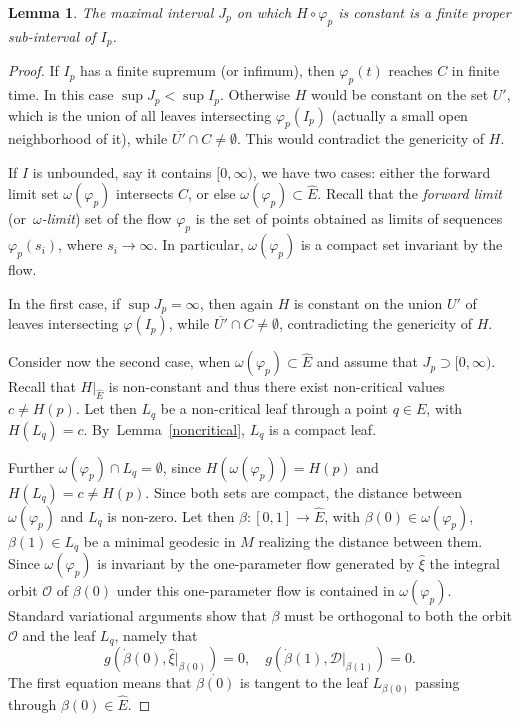 \documentclass[10pt]{amsart}
\let\mathcal\mathscr
\newtheorem{lemma}[theorem]{Lemma}
\theoremstyle{definition}
\theoremstyle{remark}
\numberwithin{equation}{section}
\begin{document}
\begin{lemma}\label{maxinterval}
The maximal interval $J_p$ on which $H\circ \varphi_p$ is constant is a finite proper sub-interval of $I_p$.
\end{lemma}
\begin{proof}
If $I_p$ has a finite supremum (or infimum), then $\varphi_p(t)$
reaches $C$ in finite time. In this case $\sup J_p <\sup I_p$. Otherwise $H$ would be constant on the set
$U'$, which is the union of all leaves intersecting $\varphi_p(I_p)$
(actually a small open neighborhood of it), while $\overline{U'}\cap C\neq \emptyset$.
This would contradict the genericity of $H$.

If $I$ is unbounded, say it contains $[0,\infty)$, we have two cases:
either the forward limit set $\omega(\varphi_p)$ intersects $C$, or else $\omega(\varphi_p)\subset \widehat{E}$.
Recall that the \emph{forward limit} (or~\emph{$\omega$-limit}) set of the flow
$\varphi_p$ is the set of points obtained as limits of sequences
$\varphi_p(s_i)$, where $s_i\to \infty$. In particular, $\omega(\varphi_p)$ is a compact set
invariant by the flow.

In the first case, if $\sup J_p=\infty$, then again
$H$ is constant on the union $U'$ of leaves intersecting $\varphi(I_p)$,
while $\overline{U'}\cap C\neq \emptyset$,
contradicting the genericity of $H$.

Consider now the second case, when $\omega(\varphi_p)\subset \widehat{E}$ and assume that $J_p\supset [0,\infty)$.
Recall that $H|_{\widehat{E}}$ is non-constant and thus there exist non-critical values $c\neq H(p)$.
Let then $L_q$ be a non-critical leaf through a point $q\in E$, with $H(L_q)=c$.
By~Lemma~\ref{noncritical}, $L_q$ is a compact leaf.

Further $\omega(\varphi_p)\cap L_q=\emptyset$, since $H(\omega(\varphi_p))=H(p)$ and
$H(L_q)=c\neq H(p)$. Since both sets are compact, the distance between $\omega(\varphi_p)$ and $L_q$ is non-zero.
Let then $\beta:[0,1]\to \widehat{E}$, with $\beta(0)\in \omega(\varphi_p)$, $\beta(1)\in L_q$
be a minimal geodesic in $M$ realizing the distance
between them.
Since $\omega(\varphi_p)$ is invariant by the one-parameter flow generated by $\widehat{\xi}$
the integral orbit $\mathcal O$ of $\beta(0)$ under this one-parameter flow is
contained in $\omega(\varphi_p)$.
Standard variational arguments show that $\beta$ must be orthogonal to both
the orbit $\mathcal O$ and the leaf $L_q$, namely that
\[g(\dot{\beta}(0),\widehat{\xi}|_{\beta(0)})=0, \quad g(\dot{\beta}(1), \mathcal D|_{\beta(1)})=0.
\]
The first equation means that $\dot{\beta(0)}$ is tangent to the leaf
$L_{\beta(0)}$ passing through \hbox{$\beta(0)\in \widehat{E}$}.


\end{proof}
\end{document}
